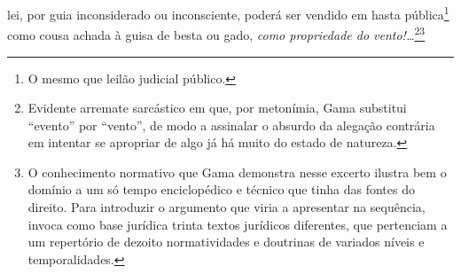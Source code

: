 lei, por guia inconsiderado ou inconsciente, poderá ser vendido em hasta
pública\footnote{O mesmo que leilão judicial público.} como cousa
achada à guisa de besta ou gado, \emph{como propriedade do
vento!\ldots{}}\footnote{Evidente arremate sarcástico em que, por
  metonímia, Gama substitui ``evento'' por ``vento'', de modo a assinalar o
  absurdo da alegação contrária em intentar se apropriar de algo já há
  muito do estado de natureza.}\footnote{O conhecimento normativo que
  Gama demonstra nesse excerto ilustra bem o domínio a um só tempo
  enciclopédico e técnico que tinha das fontes do direito. Para
  introduzir o argumento que viria a apresentar na sequência, invoca
  como base jurídica trinta textos jurídicos diferentes, que pertenciam
  a um repertório de dezoito normatividades e doutrinas de variados
  níveis e temporalidades.}
